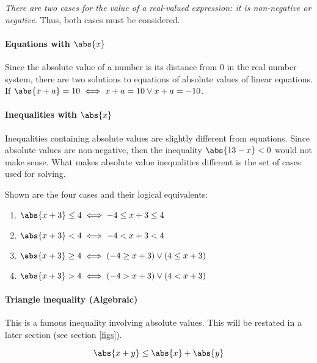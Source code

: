 \emph{There are two cases for the value of a real-valued expression: it is non-negative or negative}. Thus, both cases must be considered.

\paragraph{Equations with $\abs{x}$}
Since the absolute value of a number is its distance from $0$ in the real number system, there are two solutions to equations of absolute values of linear equations.
If $\abs{x+a} = 10 \iff x+a=10 \lor x+a=-10$.

\paragraph{Inequalities with $\abs{x}$}
Inequalities containing absolute values are slightly different from equations.
Since absolute values are non-negative, then the inequality $\abs{13-x} < 0$ would not make sense. 
What makes absolute value inequalities different is the set of cases used for solving.

Shown are the four cases and their logical equivalents:
\begin{enumerate}
    \item $\abs{x+3} \leq 4 \iff -4 \leq x+3 \leq 4$
    \item $\abs{x+3} < 4 \iff -4 < x+3 < 4$
    \item $\abs{x+3} \geq 4 \iff (-4 \geq x+3) \lor (4 \leq x+3)$
    \item $\abs{x+3} > 4 \iff (-4 > x+3) \lor (4 < x+3)$
\end{enumerate}

\paragraph{Triangle inequality (Algebraic)}
This is a famous inequality involving absolute values.
This will be restated in a later section (see section \ref{figs}).

\[
\abs{x+y} \leq \abs{x} + \abs{y}
\]
